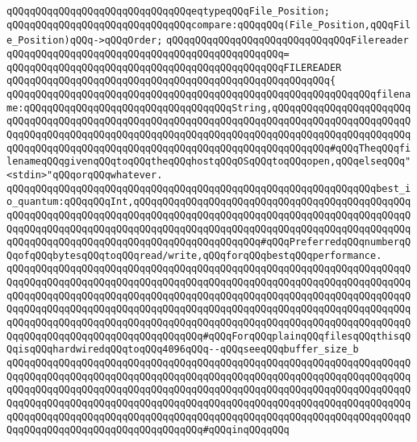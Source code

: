 \newline
\verb|qQQqqQQqqQQqqQQqqQQqqQQqqQQqqQQqeqtypeqQQqFile_Position;|\newline
\newline
\verb|qQQqqQQqqQQqqQQqqQQqqQQqqQQqqQQqcompare:qQQqqQQq(File_Position,qQQqFile_Position)qQQq->qQQqOrder;|\newline
\newline
\verb|qQQqqQQqqQQqqQQqqQQqqQQqqQQqqQQqFilereader|\newline
\verb|qQQqqQQqqQQqqQQqqQQqqQQqqQQqqQQqqQQqqQQqqQQqqQQq=|\newline
\verb|qQQqqQQqqQQqqQQqqQQqqQQqqQQqqQQqqQQqqQQqqQQqqQQqFILEREADER|\newline
\verb|qQQqqQQqqQQqqQQqqQQqqQQqqQQqqQQqqQQqqQQqqQQqqQQqqQQqqQQq{|\newline
\verb|qQQqqQQqqQQqqQQqqQQqqQQqqQQqqQQqqQQqqQQqqQQqqQQqqQQqqQQqqQQqqQQqfilename:qQQqqQQqqQQqqQQqqQQqqQQqqQQqqQQqqQQqString,qQQqqQQqqQQqqQQqqQQqqQQqqQQqqQQqqQQqqQQqqQQqqQQqqQQqqQQqqQQqqQQqqQQqqQQqqQQqqQQqqQQqqQQqqQQqqQQqqQQqqQQqqQQqqQQqqQQqqQQqqQQqqQQqqQQqqQQqqQQqqQQqqQQqqQQqqQQqqQQqqQQqqQQqqQQqqQQqqQQqqQQqqQQqqQQqqQQqqQQqqQQqqQQqqQQqqQQqqQQq#qQQqTheqQQqfilenameqQQqgivenqQQqtoqQQqtheqQQqhostqQQqOSqQQqtoqQQqopen,qQQqelseqQQq"<stdin>"qQQqorqQQqwhatever.|\newline
\newline
\verb|qQQqqQQqqQQqqQQqqQQqqQQqqQQqqQQqqQQqqQQqqQQqqQQqqQQqqQQqqQQqqQQqbest_io_quantum:qQQqqQQqInt,qQQqqQQqqQQqqQQqqQQqqQQqqQQqqQQqqQQqqQQqqQQqqQQqqQQqqQQqqQQqqQQqqQQqqQQqqQQqqQQqqQQqqQQqqQQqqQQqqQQqqQQqqQQqqQQqqQQqqQQqqQQqqQQqqQQqqQQqqQQqqQQqqQQqqQQqqQQqqQQqqQQqqQQqqQQqqQQqqQQqqQQqqQQqqQQqqQQqqQQqqQQqqQQqqQQqqQQqqQQqqQQqqQQqqQQq#qQQqPreferredqQQqnumberqQQqofqQQqbytesqQQqtoqQQqread/write,qQQqforqQQqbestqQQqperformance.|\newline
\verb|qQQqqQQqqQQqqQQqqQQqqQQqqQQqqQQqqQQqqQQqqQQqqQQqqQQqqQQqqQQqqQQqqQQqqQQqqQQqqQQqqQQqqQQqqQQqqQQqqQQqqQQqqQQqqQQqqQQqqQQqqQQqqQQqqQQqqQQqqQQqqQQqqQQqqQQqqQQqqQQqqQQqqQQqqQQqqQQqqQQqqQQqqQQqqQQqqQQqqQQqqQQqqQQqqQQqqQQqqQQqqQQqqQQqqQQqqQQqqQQqqQQqqQQqqQQqqQQqqQQqqQQqqQQqqQQqqQQqqQQqqQQqqQQqqQQqqQQqqQQqqQQqqQQqqQQqqQQqqQQqqQQqqQQqqQQqqQQqqQQqqQQqqQQqqQQqqQQqqQQqqQQqqQQqqQQqqQQqqQQqqQQq#qQQqForqQQqplainqQQqfilesqQQqthisqQQqisqQQqhardwiredqQQqtoqQQq4096qQQq--qQQqseeqQQqbuffer_size_b|\newline
\verb|qQQqqQQqqQQqqQQqqQQqqQQqqQQqqQQqqQQqqQQqqQQqqQQqqQQqqQQqqQQqqQQqqQQqqQQqqQQqqQQqqQQqqQQqqQQqqQQqqQQqqQQqqQQqqQQqqQQqqQQqqQQqqQQqqQQqqQQqqQQqqQQqqQQqqQQqqQQqqQQqqQQqqQQqqQQqqQQqqQQqqQQqqQQqqQQqqQQqqQQqqQQqqQQqqQQqqQQqqQQqqQQqqQQqqQQqqQQqqQQqqQQqqQQqqQQqqQQqqQQqqQQqqQQqqQQqqQQqqQQqqQQqqQQqqQQqqQQqqQQqqQQqqQQqqQQqqQQqqQQqqQQqqQQqqQQqqQQqqQQqqQQqqQQqqQQqqQQqqQQqqQQqqQQqqQQqqQQqqQQqqQQq#qQQqinqQQqqQQq|\newline
